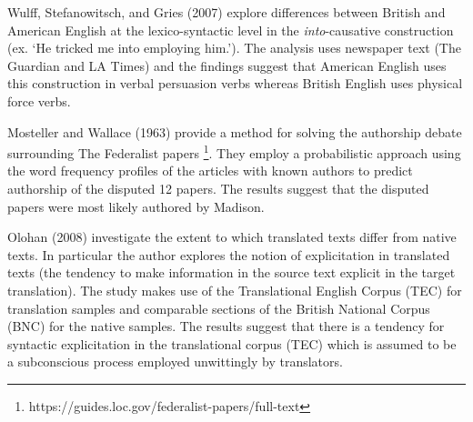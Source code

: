\documentclass[
  letterpaper,
]{latex/krantz}
\begin{document}
\begin{tcolorbox}[enhanced jigsaw, opacitybacktitle=0.6, breakable, colframe=quarto-callout-caution-color-frame, arc=.35mm, left=2mm, leftrule=.75mm, title=\textcolor{quarto-callout-caution-color}{\faFire}\hspace{0.5em}{Case study}, opacityback=0, colback=white, toptitle=1mm, rightrule=.15mm, titlerule=0mm, bottomtitle=1mm, bottomrule=.15mm, coltitle=black, colbacktitle=quarto-callout-caution-color!10!white, toprule=.15mm]
Wulff, Stefanowitsch, and Gries (2007) explore differences between
British and American English at the lexico-syntactic level in the
\emph{into}-causative construction (ex. `He tricked me into employing
him.'). The analysis uses newspaper text (The Guardian and LA Times) and
the findings suggest that American English uses this construction in
verbal persuasion verbs whereas British English uses physical force
verbs.
\end{tcolorbox}

\begin{tcolorbox}[enhanced jigsaw, opacitybacktitle=0.6, breakable, colframe=quarto-callout-caution-color-frame, arc=.35mm, left=2mm, leftrule=.75mm, title=\textcolor{quarto-callout-caution-color}{\faFire}\hspace{0.5em}{Case study}, opacityback=0, colback=white, toptitle=1mm, rightrule=.15mm, titlerule=0mm, bottomtitle=1mm, bottomrule=.15mm, coltitle=black, colbacktitle=quarto-callout-caution-color!10!white, toprule=.15mm]
Mosteller and Wallace (1963) provide a method for solving the authorship
debate surrounding The Federalist papers \footnote{https://guides.loc.gov/federalist-papers/full-text}.
They employ a probabilistic approach using the word frequency profiles
of the articles with known authors to predict authorship of the disputed
12 papers. The results suggest that the disputed papers were most likely
authored by Madison.
\end{tcolorbox}

\begin{tcolorbox}[enhanced jigsaw, opacitybacktitle=0.6, breakable, colframe=quarto-callout-caution-color-frame, arc=.35mm, left=2mm, leftrule=.75mm, title=\textcolor{quarto-callout-caution-color}{\faFire}\hspace{0.5em}{Case study}, opacityback=0, colback=white, toptitle=1mm, rightrule=.15mm, titlerule=0mm, bottomtitle=1mm, bottomrule=.15mm, coltitle=black, colbacktitle=quarto-callout-caution-color!10!white, toprule=.15mm]
Olohan (2008) investigate the extent to which translated texts differ
from native texts. In particular the author explores the notion of
explicitation in translated texts (the tendency to make information in
the source text explicit in the target translation). The study makes use
of the Translational English Corpus (TEC) for translation samples and
comparable sections of the British National Corpus (BNC) for the native
samples. The results suggest that there is a tendency for syntactic
explicitation in the translational corpus (TEC) which is assumed to be a
subconscious process employed unwittingly by translators.
\end{tcolorbox}
\end{document}
